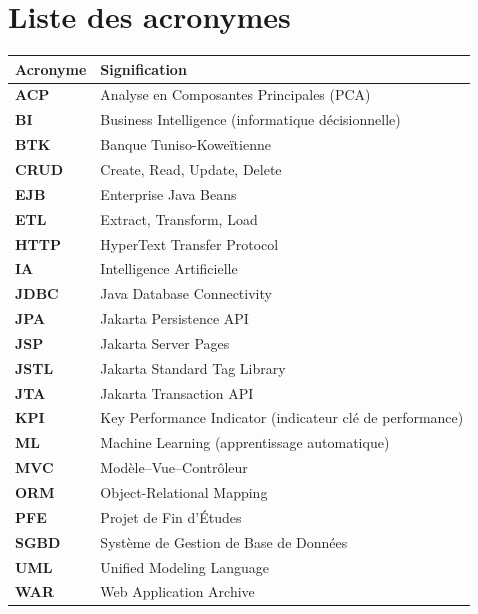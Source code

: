 \chapter*{Liste des acronymes}

\begingroup
{}
\renewcommand{\arraystretch}{1.25}
\begin{longtable}{|>{\bfseries}p{3cm}|p{11cm}|}
\hline
\textmd{\textbf{Acronyme}} & \textbf{Signification}\\
\hline
\endhead
ACP   & Analyse en Composantes Principales (PCA)\\
\hline
BI    & Business Intelligence (informatique décisionnelle)\\
\hline
BTK   & Banque Tuniso-Koweïtienne\\
\hline
CRUD  & Create, Read, Update, Delete\\
\hline
EJB   & Enterprise Java Beans\\
\hline
ETL   & Extract, Transform, Load\\
\hline
HTTP  & HyperText Transfer Protocol\\
\hline
IA    & Intelligence Artificielle\\
\hline
JDBC  & Java Database Connectivity\\
\hline
JPA   & Jakarta Persistence API\\
\hline
JSP   & Jakarta Server Pages\\
\hline
JSTL  & Jakarta Standard Tag Library\\
\hline
JTA   & Jakarta Transaction API\\
\hline
KPI   & Key Performance Indicator (indicateur clé de performance)\\
\hline
ML    & Machine Learning (apprentissage automatique)\\
\hline
MVC   & Modèle--Vue--Contrôleur\\
\hline
ORM   & Object-Relational Mapping\\
\hline
PFE   & Projet de Fin d'Études\\
\hline
SGBD  & Système de Gestion de Base de Données\\
\hline
UML   & Unified Modeling Language\\
\hline
WAR   & Web Application Archive\\
\hline
\end{longtable}
\endgroup
